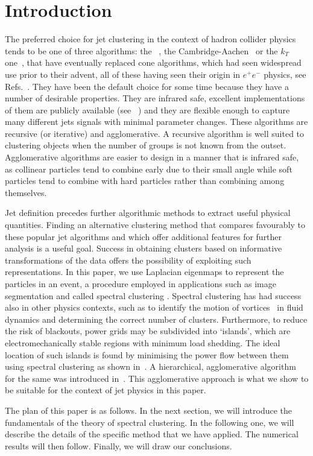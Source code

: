 \section{Introduction}\label{sec:JetClustering}

The preferred choice for jet clustering in the context of hadron collider physics tends to be one of three algorithms:  
the \antikt{}~\cite{Cacciari:2008gp}, the Cambridge-Aachen~\cite{Dokshitzer:1997in,Wobisch:1998wt} or the $k_T$  one~\cite{Ellis:1993tq}, that have  eventually replaced cone algorithms, which had seen widespread use prior to their advent, all of these having seen  their origin in $e^+e^-$ physics, see  Refs.~\cite{Sterman:1977wj,Bethke:1991wk,Catani:1991hj,Moretti:1998qx}.
They have been the default choice for some time because they have a number of desirable properties.
They are infrared safe, excellent implementations of them are publicly available (see \fastjet{}~\cite{Cacciari:2011ma})
and they are flexible enough to capture many different jets signals with minimal parameter changes.
These algorithms are recursive (or iterative) and agglomerative.
A recursive algorithm is well suited to clustering objects when the number of groups is not known from the outset.
Agglomerative algorithms are easier to design in a manner that is infrared safe,
as collinear particles tend to combine early due to their small angle while
 soft particles tend to combine with hard particles rather than combining  among themselves.

Jet definition precedes further algorithmic methods to extract useful
physical quantities. Finding an alternative clustering method that compares favourably to
these popular jet algorithms and which offer additional features for further analysis is a
useful goal. Success in obtaining clusters based on informative transformations of the data
offers the possibility of exploiting such representations.
In this paper, we use Laplacian eigenmaps \cite{Belkin:2003_unfound4} to represent the particles
in an event, a procedure employed in applications such as image segmentation \cite{Shi:1997_unfound595}
and called spectral clustering \cite{Ng:2001_unfound543}.
Spectral clustering has had success also in other physics contexts, such as to identify the motion
of vortices~\cite{Hadjighasem:2016_unfound447} in fluid dynamics and determining the correct number of clusters.
Furthermore, to reduce the risk of blackouts, power grids may be subdivided into `islands',
which are
electromechanically stable regions with minimum load shedding.
The ideal location of such islands is found by minimising the power flow between them using spectral clustering as shown in~\cite{HaoLi:2005_unfound114}.  A hierarchical, agglomerative algorithm for the same was introduced in~\cite{RJSanchezGarcia:2014_unfound420}.
This agglomerative approach is what we show to be suitable for the context of jet physics in this paper.

The plan of this paper is as follows. In the next section, we will introduce the fundamentals of the theory of spectral clustering. In the following one, we will describe the details of the specific method that we have applied. The numerical results will then follow. Finally, we will draw our conclusions. 
